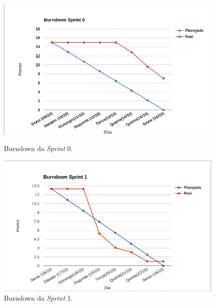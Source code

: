 	\begin{figure}[!h]
	\begin{minipage}[b]{0.5\linewidth} 
	\centering
	\includegraphics[scale=0.5]{figuras/burndown_sprint0.png}
	\caption{Burndown da \textit{Sprint} 0.}
	\label{fig:burndown0}
	\end{minipage}
	\hspace{0.5cm} 
	\begin{minipage}[b]{0.5\linewidth}
	\centering
	\includegraphics[scale=0.5]{figuras/burndown_sprint1.png}
	\caption{Burndown da \textit{Sprint} 1.}
	\label{fig:burndown1}
	\end{minipage}
	\end{figure}
	
